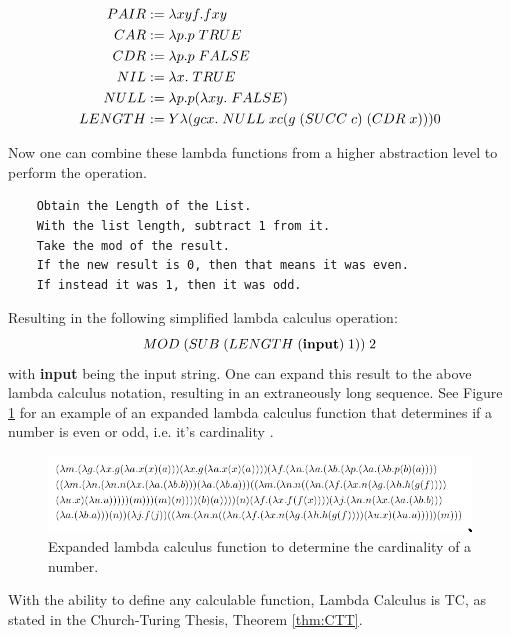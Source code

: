 \[\begin{aligned}
        PAIR &:= \lambda xyf. f x y\\
        CAR &:= \lambda p. p \hspace{0.1cm} TRUE\\
        CDR &:= \lambda p. p \hspace{0.1cm} FALSE\\
        NIL &:= \lambda x. \hspace{0.1cm} TRUE\\
        NULL &:= \lambda p. p (\lambda xy. \hspace{0.1cm} FALSE)\\
        LENGTH &:= Y \lambda (gcx. \hspace{0.1cm} NULL \hspace{0.1cm} x c (g \hspace{0.1cm} (SUCC \hspace{0.1cm} c) \hspace{0.1cm} (CDR \hspace{0.1cm} x))) 0\\
    \end{aligned}
\]

Now one can combine these lambda functions from a higher abstraction level to perform the operation.

\begin{verbatim}
    Obtain the Length of the List.
    With the list length, subtract 1 from it.
    Take the mod of the result.
    If the new result is 0, then that means it was even.
    If instead it was 1, then it was odd.
\end{verbatim}

Resulting in the following simplified lambda calculus operation:\[MOD \hspace{0.1cm} (SUB \hspace{0.1cm} (LENGTH \hspace{0.1cm} (\textbf{input}) \hspace{0.1cm} 1)) \hspace{0.1cm} 2\]
with \textbf{input} being the input string.
One can expand this result to the above lambda calculus notation, resulting in an extraneously long sequence.
See Figure \ref{fig:OddEvenLambda} for an example of an expanded lambda calculus function that determines if a number is even or odd, i.e. it's cardinality \cite{RedditLambdaCalcPost,RedditLambdaCalcComment}.

\begin{figure}[htb]
    \centering
    \includegraphics[width=16cm]{Images/oddevenlambda.png}
       \caption{Expanded lambda calculus function to determine the cardinality of a number.}
           \label{fig:OddEvenLambda}
\end{figure}

With the ability to define any calculable function, Lambda Calculus is TC, as stated in the Church-Turing Thesis, Theorem \ref{thm:CTT}.